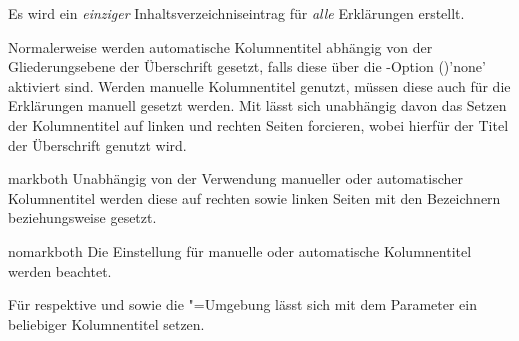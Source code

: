 \begin{Declaration*}{}
\begin{Declaration*}{}
\begin{Declaration*}{}
\begin{Declaration}
\begin{values}{}
  Es wird ein \emph{einziger} Inhaltsverzeichniseintrag für \emph{alle} 
  Erklärungen erstellt.
\end{values}
%
Normalerweise werden automatische Kolumnentitel abhängig von der 
Gliederungsebene der Überschrift gesetzt, falls diese über die 
\KOMAScript-Option ()'none' 
aktiviert sind. Werden manuelle Kolumnentitel genutzt, müssen diese auch für 
die Erklärungen manuell gesetzt werden. Mit  lässt 
sich unabhängig davon das Setzen der Kolumnentitel auf linken und rechten 
Seiten forcieren, wobei hierfür der Titel der Überschrift genutzt wird.
%
\begin{values}{}
\item[markboth]
  Unabhängig von der Verwendung manueller oder automatischer Kolumnentitel 
  werden diese auf rechten sowie linken Seiten mit den Bezeichnern 
   beziehungsweise  gesetzt.
\item[nomarkboth]
  Die Einstellung für manuelle oder automatische Kolumnentitel werden beachtet.
\end{values}
%
Für  respektive  und  
sowie die "=Umgebung lässt sich mit dem Parameter 
 ein beliebiger Kolumnentitel setzen. 


\end{Declaration}
\end{Declaration*}
\end{Declaration*}
\end{Declaration*}
